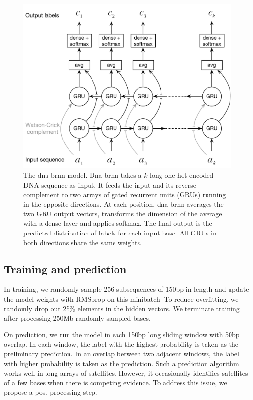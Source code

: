 \documentclass{bioinfo}
\begin{document}
\begin{methods}
\begin{figure}[tb]
\centering
\includegraphics[width=.45\textwidth]{dna-nn-fig}
\caption{The dna-brnn model. Dna-brnn takes a $k$-long one-hot encoded DNA
sequence as input. It feeds the input and its reverse complement to two arrays
of gated recurrent units (GRUs) running in the opposite directions. At each
position, dna-brnn averages the two GRU output vectors, transforms the
dimension of the average with a dense layer and applies softmax. The final
output is the predicted distribution of labels for each input base. All GRUs in
both directions share the same weights.}\label{fig:model}
\end{figure}

\subsection{Training and prediction}

In training, we randomly sample 256 subsequences of 150bp in length and update
the model weights with RMSprop on this minibatch. To reduce overfitting, we
randomly drop out 25\% elements in the hidden vectors. We terminate
training after processing 250Mb randomly sampled bases.

On prediction, we run the model in each 150bp long sliding window with 50bp
overlap. In each window, the label with the highest probability is taken as the
preliminary prediction. In an overlap between two adjacent windows, the label
with higher probability is taken as the prediction. Such a prediction
algorithm works well in long arrays of satellites. However, it occasionally
identifies satellites of a few bases when there is competing evidence. To
address this issue, we propose a post-processing step.


\end{methods}
\end{document}
